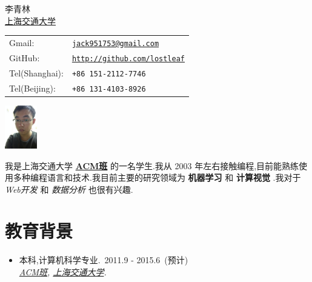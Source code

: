 \documentclass[letterpaper]{article}
\def\cname{李青林}
\begin{document}
\begin{minipage}{0.35\linewidth}
  {\huge  \cname}
  \vspace{0.1in} \\
  \href{http://www.sjtu.edu.cn/}{上海交通大学}
\end{minipage}
\begin{minipage}{0.45\linewidth}
  \begin{tabular}{ll}
    Gmail:  & \href{mailto:jack951753@gmail.com}{\tt jack951753@gmail.com} \\
    GitHub: & \href{https://github.com/lostleaf}{\tt http://github.com/lostleaf} \\
    Tel(Shanghai):    & {\tt +86 151-2112-7746}\\
    Tel(Beijing): & {\tt +86 131-4103-8926}
  \end{tabular}
\end{minipage}
\begin{minipage}{0.45\linewidth}
\includegraphics[width=40pt]{photo}
\end{minipage}

我是上海交通大学 \textbf{\href{http://acm.sjtu.edu.cn}{ACM班}} 的一名学生.我从 2003 年左右接触编程,目前能熟练使用多种编程语言和技术.我目前主要的研究领域为 \textbf{机器学习} 和 \textbf{计算视觉} .我对于 {\it Web开发} 和 {\it 数据分析} 也很有兴趣. 


\section*{教育背景}

\begin{itemize}

\item  本科,计算机科学专业.\quad\quad~2011.9 - 2015.6~(预计) \\
    \emph{\href{http://acm.sjtu.edu.cn}{ACM班},
    \href{http://www.sjtu.edu.cn/}{上海交通大学}.}
\end{itemize}
\end{document}
